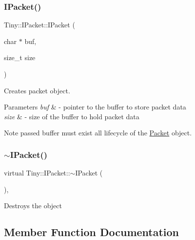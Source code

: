 \subsubsection{\texorpdfstring{I\+Packet()}{IPacket()}}
{\footnotesize\ttfamily Tiny\+::\+I\+Packet\+::\+I\+Packet (\begin{DoxyParamCaption}\item[{char $\ast$}]{buf,  }\item[{size\+\_\+t}]{size }\end{DoxyParamCaption})\hspace{0.3cm}{\ttfamily [inline]}}

Creates packet object. 
\begin{DoxyParams}{Parameters}
{\em buf} & -\/ pointer to the buffer to store packet data \\
\hline
{\em size} & -\/ size of the buffer to hold packet data \\
\hline
\end{DoxyParams}
\begin{DoxyNote}{Note}
passed buffer must exist all lifecycle of the \hyperlink{classTiny_1_1Packet}{Packet} object. 
\end{DoxyNote}
\mbox{\label{classTiny_1_1IPacket_a187fce5726b428db3a36e62522472c5b}} 
\subsubsection{\texorpdfstring{$\sim$\+I\+Packet()}{~IPacket()}}
{\footnotesize\ttfamily virtual Tiny\+::\+I\+Packet\+::$\sim$\+I\+Packet (\begin{DoxyParamCaption}{ }\end{DoxyParamCaption})\hspace{0.3cm}{\ttfamily [virtual]}, {\ttfamily [default]}}

Destroys the object 

\subsection{Member Function Documentation}
\mbox{\label{classTiny_1_1IPacket_a6cc28c5235de6a9ce68bea546a4db17c}} 
